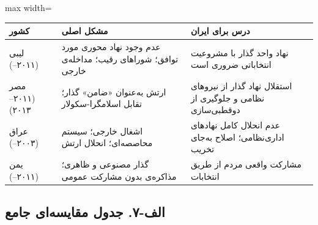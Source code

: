 \vspace{0.5\baselineskip}
\begin{adjustbox}{max width=\linewidth}
\begin{tabular}{@{}p{2.5cm}p{4cm}p{6.5cm}@{}}
\toprule
\textbf{کشور} & \textbf{مشکل اصلی} & \textbf{درس برای ایران} \\
\midrule
\rowcolor{DangerBg}
لیبی (۲۰۱۱--) &
  عدم وجود نهاد محوری مورد توافق؛ شوراهای رقیب؛ مداخله‌ی خارجی &
  نهاد واحد گذار با مشروعیت انتخاباتی ضروری است \\
\addlinespace
\rowcolor{DangerBg}
مصر (۲۰۱۱--۲۰۱۳) &
  ارتش به‌عنوان «ضامن» گذار؛ تقابل اسلامگرا-سکولار &
  استقلال نهاد گذار از نیروهای نظامی و جلوگیری از دوقطبی‌سازی \\
\addlinespace
\rowcolor{DangerBg}
عراق (۲۰۰۳--) &
  اشغال خارجی؛ سیستم محاصصه‌ای؛ انحلال ارتش &
  عدم انحلال کامل نهادهای اداری‌نظامی؛ اصلاح به‌جای تخریب \\
\addlinespace
\rowcolor{DangerBg}
یمن (۲۰۱۱--) &
  گذار مصنوعی و ظاهری؛ مذاکره‌ی بدون مشارکت عمومی &
  مشارکت واقعی مردم از طریق انتخابات \\
\bottomrule
\end{tabular}
\end{adjustbox}

\subsection{الف-۷. جدول مقایسه‌ای جامع}

